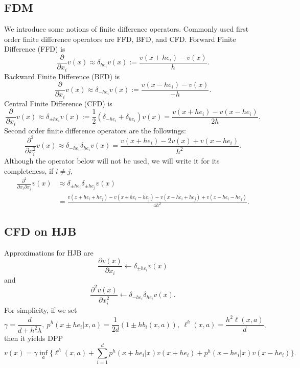 \documentclass[11pt]{amsart}
\begin{document}
\subsection{FDM}
We introduce some notions of finite difference operators.
Commonly used first order finite difference operators 
are FFD, BFD, and CFD. 
Forward Finite Difference (FFD) is
$$\frac{\partial}{\partial x_{i}}v(x) \approx \delta_{he_{i}} v(x) 
:= \frac{v(x+he_{i}) - v(x)}{h}.$$
Backward Finite Difference (BFD) is
$$\frac{\partial}{\partial x_{i}}v(x) \approx \delta_{-he_{i}} v(x) 
:= \frac{v(x-he_{i}) - v(x)}{-h}.$$
Central Finite Difference (CFD) is
$$\frac{\partial}{\partial x_{i}}v(x) \approx 
\delta_{\pm h e_{i}} v(x)
:= \frac 1 2 (\delta_{-he_{i}} + \delta_{he_{i}}) v(x)
= \frac{v(x+he_{i}) - v(x-he_{i})}{2h}.$$
Second order finite difference operators are the followings:
$$
\frac{\partial^{2}}{\partial x_{i}^{2}} v(x)
\approx
\delta_{-he_{i}} \delta_{he_{i}} v(x)
= \frac{v(x+he_{i}) - 2 v(x) + v(x- he_{i})}{h^{2}}.
$$
Although the operator below will not be used, we will write it for its completeness, if $i \neq j$, 
$$
\begin{array}
 {ll}
\frac{\partial^{2}}{\partial x_{i} \partial x_{j}} v(x) &\approx
\delta_{\pm he_{i}} \delta_{\pm he_{j}} v(x)
\\ 
& \displaystyle
= \frac{v(x+he_{i}+he_{j}) - v(x+he_{i}-he_{j})
- v(x-he_{i}+he_{j})+ v(x-he_{i}-he_{j})}{4h^{2}}. 
\end{array}
$$


\subsection{CFD on HJB}
Approximations for HJB are 
$$
\frac{\partial v(x)}{\partial x_i} \leftarrow 
\delta_{\pm h e_{i}} v(x)
$$
and
$$
\frac{\partial^2 v(x)}{\partial x_i^2} \leftarrow
\delta_{-he_{i}} \delta_{he_{i}} v(x).$$
For simplicity, if we set 
$$
\gamma = \frac{d}{d+ h^{2} \lambda}, \
p^{h}(x \pm he_{i}|x, a) = \frac 1 {2d} (1\pm h b_{i}(x, a)), \
\ell^{h}(x, a) = \frac{h^{2} \ell(x, a)}{d},
$$
then it yields DPP
$$
v (x) = \gamma \inf_{a} 
\Big\{ \ell^{h}(x, a) + 
\sum_{i=1}^{d} 
p^{h}(x+he_{i}|x) v(x+he_{i})
+ p^{h}(x-he_{i}|x) v(x-he_{i})
\Big\}.
$$
\end{document}
